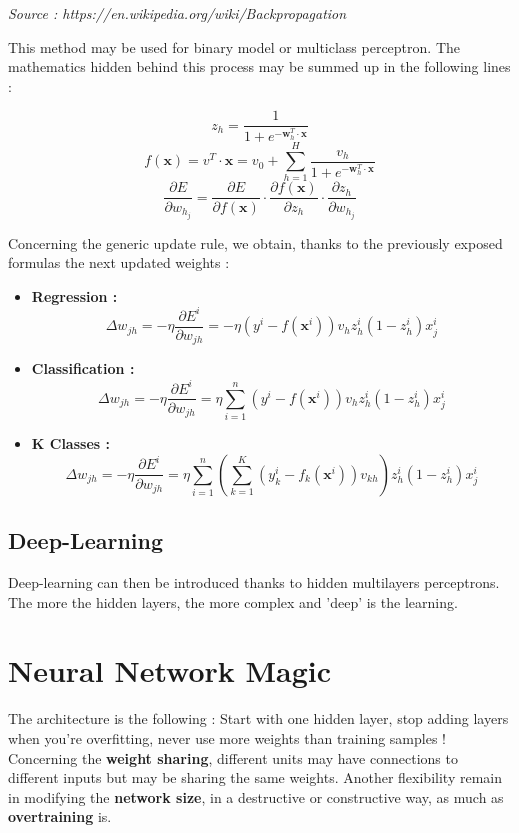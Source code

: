 \documentclass[a4paper,12pt]{article}
\newcommand{\xx}{{\bm x}}
\newcommand{\ww}{{\bm w}}
\begin{document}
\vspace{0.1in}

{\itshape Source : https://en.wikipedia.org/wiki/Backpropagation}

\vspace{0.1in}

\indent
This method may be used for binary model or multiclass perceptron. The mathematics hidden behind this process may be summed up in the following lines :

\[ z_h = \frac{1}{1+e^{- \ww_h^T \cdot \xx}}\]
\[ f(\xx) = v^T \cdot \xx = v_0 + \sum_{h=1}^H \frac{v_h}{1+e^{- \ww_h^T \cdot \xx}} \]
\[ \frac{\partial E}{\partial w_{h_j}} = \frac{\partial E}{\partial f(\xx)} \cdot \frac{\partial f(\xx)}{\partial z_h} \cdot \frac{\partial z_h}{\partial  w_{h_j}} \]

\vspace{0.1in}

\indent
Concerning the generic update rule, we obtain, thanks to the previously exposed formulas the next updated weights :

\begin{itemize}
\item {\bfseries Regression :}
\[ \Delta w_{jh} = -\eta \frac{\partial E^i}{\partial w_{jh}} = -\eta (y^i - f(\xx^i)) v_h z_h^i (1 - z_h^i) x_j^i \]
\item {\bfseries Classification :}
\[ \Delta w_{jh} = - \eta \frac{\partial E^i}{\partial w_{jh}} = \eta \sum_{i=1}^n (y^i - f(\xx^i)) v_h z_h^i (1 - z_h^i) x_j^i \]
\item {\bfseries K Classes :}
\[ \Delta w_{jh} = - \eta \frac{\partial E^i}{\partial w_{jh}} = \eta \sum_{i=1}^n \left( \sum_{k=1}^K (y_k^i - f_k(\xx^i)) v_{kh} \right) z_h^i (1 - z_h^i) x_j^i \]
\end{itemize}

\subsection{Deep-Learning}

\indent
Deep-learning can then be introduced thanks to hidden multilayers perceptrons. The more the hidden layers, the more complex and 'deep' is the learning.

\section{Neural Network Magic}

\indent 
The architecture is the following : Start with one hidden layer, stop adding layers when you're overfitting, never use more weights than training samples ! Concerning the {\bfseries weight sharing}, different units may have connections to different inputs but may be sharing the same weights. Another flexibility remain in modifying the {\bfseries network size}, in a destructive or constructive way, as much as {\bfseries overtraining} is.
\end{document}
